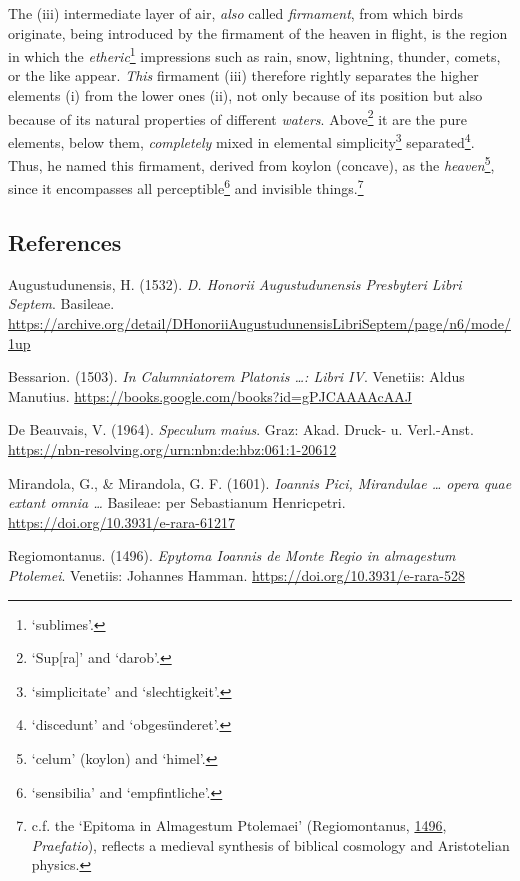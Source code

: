 \documentclass[
]{article}
\begin{document}
The (iii) intermediate layer of air, \emph{also} called
\emph{firmament}, from which birds originate, being introduced by the
firmament of the heaven in flight, is the region in which the
\emph{etheric}\footnote{`sublimes'.} impressions such as rain, snow,
lightning, thunder, comets, or the like appear. \emph{This} firmament
(iii) therefore rightly separates the higher elements (i) from the lower
ones (ii), not only because of its position but also because of its
natural properties of different \emph{waters}. Above\footnote{`Sup{[}ra{]}'
  and `darob'.} it are the pure elements, below them, \emph{completely}
mixed in elemental simplicity\footnote{`simplicitate' and
  `slechtigkeit'.} separated\footnote{`discedunt' and `obgesünderet'.}.
Thus, he named this firmament, derived from koylon (concave), as the
\emph{heaven}\footnote{`celum' (koylon) and `himel'.}, since it
encompasses all perceptible\footnote{`sensibilia' and `empfintliche'.}
and invisible things.\footnote{c.f. the `Epitoma in Almagestum
  Ptolemaei' (Regiomontanus,
  \href{https://doi.org/10.3931/e-rara-528}{1496}, \emph{Praefatio}),
  reflects a medieval synthesis of biblical cosmology and Aristotelian
  physics.}

\hypertarget{references}{%
\subsection{References}\label{references}}

Augustudunensis, H. (1532). \emph{D. Honorii Augustudunensis Presbyteri
Libri Septem}. Basileae.
\url{https://archive.org/detail/DHonoriiAugustudunensisLibriSeptem/page/n6/mode/1up}

Bessarion. (1503). \emph{In Calumniatorem Platonis \ldots: Libri IV}.
Venetiis: Aldus Manutius.
\url{https://books.google.com/books?id=gPJCAAAAcAAJ}

De Beauvais, V. (1964). \emph{Speculum maius}. Graz: Akad. Druck- u.
Verl.-Anst. \url{https://nbn-resolving.org/urn:nbn:de:hbz:061:1-20612}

Mirandola, G., \& Mirandola, G. F. (1601). \emph{Ioannis Pici,
Mirandulae \ldots{} opera quae extant omnia \ldots{}} Basileae: per
Sebastianum Henricpetri. \url{https://doi.org/10.3931/e-rara-61217}

Regiomontanus. (1496). \emph{Epytoma Ioannis de Monte Regio in
almagestum Ptolemei}. Venetiis: Johannes Hamman.
\url{https://doi.org/10.3931/e-rara-528}
\end{document}

